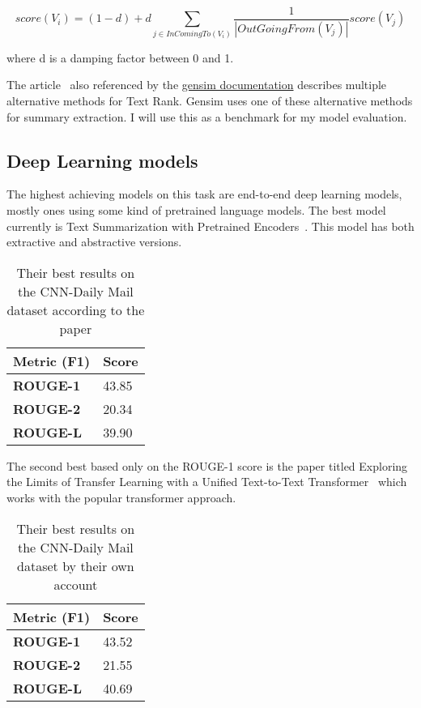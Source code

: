 \[score(V_i) = (1 - d) + d \sum_{j \in InComingTo(V_i)} \frac{1}{|OutGoingFrom(V_j)|} score(V_j)\]

where d is a damping factor between 0 and 1.

The article~\cite{TextRank} also referenced by the \href{https://radimrehurek.com/gensim/summarization/summariser.html}{gensim documentation} describes multiple alternative methods for Text Rank. Gensim uses one of these alternative methods for summary extraction.
I will use this as a benchmark for my model evaluation.
\FloatBarrier

\subsection{Deep Learning models}

The highest achieving models on this task are end-to-end deep learning models, mostly ones using some kind of pretrained language models.
The best model currently is Text Summarization with Pretrained Encoders~\cite{BERTsum}. This model has both extractive and abstractive versions.

\begin{table}[!ht]
	\centering
	\begin{tabular}{| l | l |}
		\hline 
		\textbf{Metric (F1)}&\textbf{Score} \\ \hline \hline
		\textbf{ROUGE-1}&43.85 \\ \hline
		\textbf{ROUGE-2}&20.34 \\ \hline
		\textbf{ROUGE-L}&39.90 \\ \hline
	\end{tabular}
	\caption{Their best results on the CNN-Daily Mail dataset according to the paper}
\end{table}
\FloatBarrier

The second best based only on the ROUGE-1 score is the paper titled Exploring the Limits of Transfer Learning with a Unified Text-to-Text Transformer~\cite{TransferSum} which works with the popular transformer approach.

\begin{table}[!ht]
	\centering
	\begin{tabular}{| l | l |}
		\hline 
		\textbf{Metric (F1)}&\textbf{Score} \\ \hline \hline
		\textbf{ROUGE-1}&43.52 \\ \hline
		\textbf{ROUGE-2}&21.55 \\ \hline
		\textbf{ROUGE-L}&40.69 \\ \hline
	\end{tabular}
	\caption{Their best results on the CNN-Daily Mail dataset by their own account}
\end{table}
\FloatBarrier

